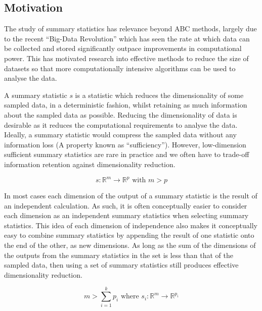 \documentclass[bibliography=totoc,11pt,a4paper,margin=0]{article}
\theoremstyle{break}
\begin{document}
\subsection{Motivation}\label{sec_summary_stats_motivation}


  \par The study of summary statistics has relevance beyond ABC methods, largely due to the recent ``Big-Data Revolution'' which has seen the rate at which data can be collected and stored significantly outpace improvements in computational power. This has motivated research into effective methods to reduce the size of datasets so that more computationally intensive algorithms can be used to analyse the data. %

  \par A summary statistic $s$ is a statistic which reduces the dimensionality of some sampled data, in a deterministic fashion, whilst retaining as much information about the sampled data as possible. Reducing the dimensionality of data is desirable as it reduces the computational requirements to analyse the data. Ideally, a summary statistic would compress the sampled data without any information loss (A property known as ``sufficiency''). However, low-dimension sufficient summary statistics are rare in practice and we often have to trade-off information retention against dimensionality reduction.

  \[ s:\mathbb{R}^m\to\mathbb{R}^p\text{ with }m>p \]

  \par In most cases each dimension of the output of a summary statistic is the result of an independent calculation. As such, it is often conceptually easier to consider each dimension as an independent summary statistics when selecting summary statistics. This idea of each dimension of independence also makes it conceptually easy to combine summary statistics by appending the result of one statistic onto the end of the other, as new dimensions. %
  As long as the sum of the dimensions of the outputs from the summary statistics in the set is less than that of the sampled data, then using a set of summary statistics still produces effective dimensionality reduction.

  \[ m>\sum_{i=1}^kp_i\text{ where }s_i:\mathbb{R}^m\to\mathbb{R}^{p_i} \]
\end{document}
